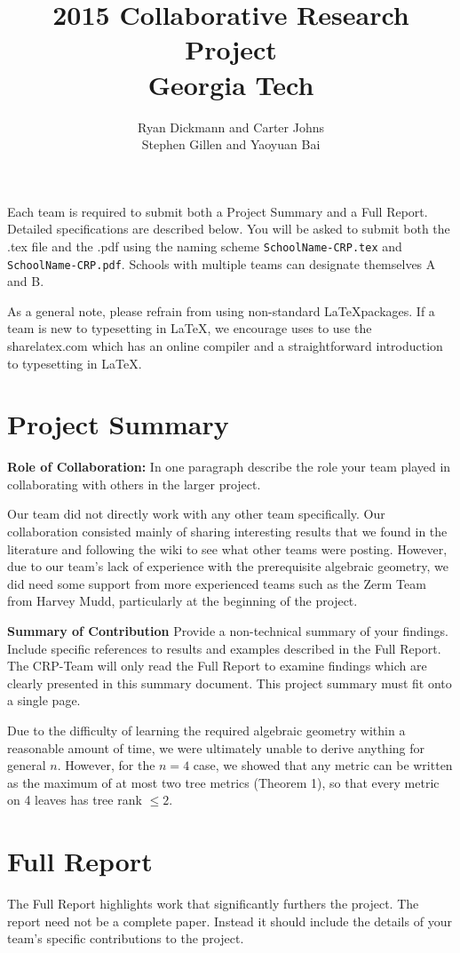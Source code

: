 \documentclass[12pt]{amsart}
\title{2015 Collaborative Research Project \\ Georgia Tech}
\author{Ryan Dickmann and Carter Johns \\ Stephen Gillen and Yaoyuan Bai}
\begin{document}
\maketitle
Each team is required to submit both  a Project Summary and a Full Report.  Detailed specifications are described below.   You will be asked to submit both the .tex file and the .pdf using the naming scheme {\tt SchoolName-CRP.tex} and {\tt SchoolName-CRP.pdf}.  Schools with multiple teams can designate themselves A and B.

 As a general note, please refrain from using non-standard \LaTeX packages.  If a team is new to typesetting in \LaTeX, we encourage uses to use the sharelatex.com which has an online compiler and a straightforward introduction to typesetting in \LaTeX.

\section{Project Summary}
{\large \bf Role of Collaboration:} 
In one paragraph describe the role your team played in collaborating with others in the larger project.

Our team did not directly work with any other team specifically. Our collaboration consisted mainly of sharing interesting results that we found in the literature and following the wiki to see what other teams were posting. However, due to our team's lack of experience with the prerequisite algebraic geometry, we did need some support from more experienced teams such as the Zerm Team from Harvey Mudd, particularly at the beginning of the project.

{\large \bf Summary of Contribution} 
Provide a non-technical summary of your findings. Include specific references to results and examples described in the Full Report.  The CRP-Team will only read the Full Report to examine findings which are clearly presented in this summary document. This project summary must fit onto a single page. 

Due to the difficulty of learning the required algebraic geometry within a reasonable amount of time, we were ultimately unable to derive anything for general $n$. However, for the $n=4$ case, we showed that any metric can be written as the maximum of at most two tree metrics (Theorem 1), so that every metric on 4 leaves has tree rank $\leq 2$.
\newpage
\section{Full Report}
The Full Report highlights work that significantly furthers the project. The report need not be a complete paper. Instead it should include the details of your team's specific contributions to the project.  
\end{document}
